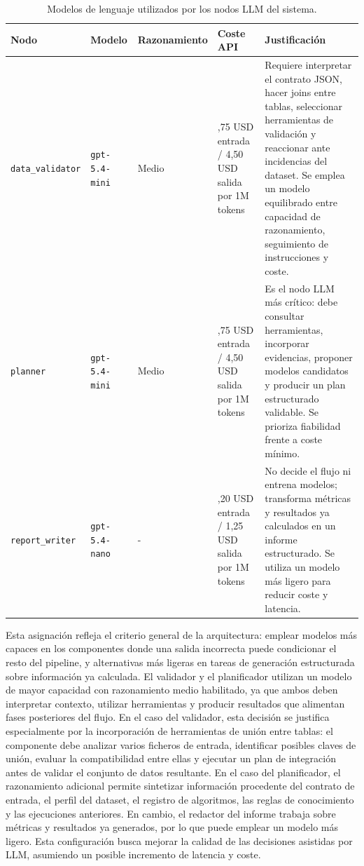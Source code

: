 \documentclass[12pt,a4paper]{article}
\theoremstyle{plain}
\begin{document}
\begin{table}[htbp]
\centering
\footnotesize
\setlength{\tabcolsep}{4pt}
\renewcommand{\arraystretch}{1.05}
\begin{tabularx}{\linewidth}{>{\RaggedRight\arraybackslash}p{2.6cm} >{\RaggedRight\arraybackslash}p{2.2cm} >{\RaggedRight\arraybackslash}p{2.0cm} >{\RaggedRight\arraybackslash}p{3.0cm} >{\RaggedRight\arraybackslash}X}
\hline
\textbf{Nodo} & \textbf{Modelo} & \textbf{Razonamiento} & \textbf{Coste API} & \textbf{Justificación} \\\hline
\texttt{data\_validator} & \texttt{gpt-5.4-mini} & Medio & 0,75 USD entrada / 4,50 USD salida por 1M tokens & Requiere interpretar el contrato JSON, hacer joins entre tablas, seleccionar herramientas de validación y reaccionar ante incidencias del dataset. Se emplea un modelo equilibrado entre capacidad de razonamiento, seguimiento de instrucciones y coste. \\\hline
\texttt{planner} & \texttt{gpt-5.4-mini} & Medio & 0,75 USD entrada / 4,50 USD salida por 1M tokens & Es el nodo LLM más crítico: debe consultar herramientas, incorporar evidencias, proponer modelos candidatos y producir un plan estructurado validable. Se prioriza fiabilidad frente a coste mínimo. \\\hline
\texttt{report\_writer} & \texttt{gpt-5.4-nano} & - & 0,20 USD entrada / 1,25 USD salida por 1M tokens & No decide el flujo ni entrena modelos; transforma métricas y resultados ya calculados en un informe estructurado. Se utiliza un modelo más ligero para reducir coste y latencia. \\\hline
\end{tabularx}
\caption{Modelos de lenguaje utilizados por los nodos LLM del sistema.\cite{models_openai_api}}
\label{tab:modelos-llm-nodos}
\end{table}



Esta asignación refleja el criterio general de la arquitectura: emplear modelos más capaces en los componentes donde una salida incorrecta puede condicionar el resto del pipeline, y alternativas más ligeras en tareas de generación estructurada sobre información ya calculada. El validador y el planificador utilizan un modelo de mayor capacidad con razonamiento medio habilitado, ya que ambos deben interpretar contexto, utilizar herramientas y producir resultados que alimentan fases posteriores del flujo. En el caso del validador, esta decisión se justifica especialmente por la incorporación de herramientas de unión entre tablas: el componente debe analizar varios ficheros de entrada, identificar posibles claves de unión, evaluar la compatibilidad entre ellas y ejecutar un plan de integración antes de validar el conjunto de datos resultante. En el caso del planificador, el razonamiento adicional permite sintetizar información procedente del contrato de entrada, el perfil del dataset, el registro de algoritmos, las reglas de conocimiento y las ejecuciones anteriores. En cambio, el redactor del informe trabaja sobre métricas y resultados ya generados, por lo que puede emplear un modelo más ligero. Esta configuración busca mejorar la calidad de las decisiones asistidas por LLM, asumiendo un posible incremento de latencia y coste.
\end{document}
